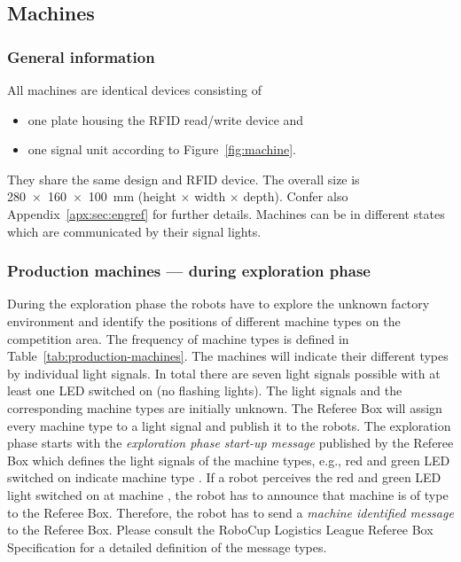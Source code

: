 \documentclass[12pt,twoside]{article}
\begin{document}

\subsection{Machines}
\label{sec:machines}

\subsubsection{General information}
All machines are identical devices consisting of 
\begin{itemize}
\item one plate housing the RFID read/write device and
\item one signal unit according to Figure~\ref{fig:machine}.
\end{itemize}

They share the same design and RFID device. The overall size is
\SI{280 x 160 x 100}{\milli\metre} (height $\times$ width $\times$
depth). Confer also Appendix~\ref{apx:sec:engref} for further
details. Machines can be in different states which are communicated by
their signal lights.

\subsubsection{Production machines --- during exploration phase}
\label{sec:production-machines-exp}
During the exploration phase the robots have to explore the unknown
factory environment and identify the positions of different machine
types on the competition area. The frequency of machine types is
defined in Table~\ref{tab:production-machines}. The machines will
indicate their different types by individual light signals. In total
there are seven light signals possible with at least one LED switched
on (no flashing lights). The light signals and the corresponding machine types are
initially unknown. The Referee Box will assign every machine type to a
light signal and publish it to the robots. The exploration phase
starts with the \emph{exploration phase start-up message} published by
the Referee Box which defines the light signals of the machine types,
e.g., red and green LED switched on indicate machine type . If a
robot perceives the red and green LED light switched on at machine
, the robot has to announce that machine  is of type  to the
Referee Box. Therefore, the robot has to send a \emph{machine
  identified message} to the Referee Box. Please consult the RoboCup
Logistics League Referee Box Specification for a detailed definition
of the message types.
\end{document}
